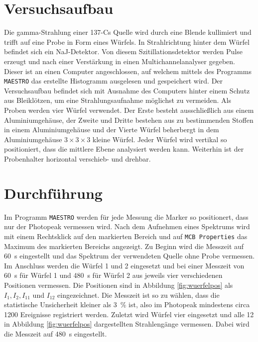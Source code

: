 \newpage
\section{Versuchsaufbau}
\label{sec:Aufbau}

Die gamma-Strahlung einer 137-Cs %
Quelle wird durch eine Blende kullimiert und trifft auf eine Probe in Form
eines Würfels.
In Strahlrichtung hinter dem Würfel befindet sich ein NaJ-Detektor.
Von diesem Szitillationsdetektor werden Pulse erzeugt
und nach einer Verstärkung in einen Multichannelanalyser gegeben.
Dieser ist an einen Computer angeschlossen,
auf welchem mittels des Programms \texttt{MAESTRO}
das erstellte Histogramm ausgelesen und gespeichert wird.
Der Versuchsaufbau befindet sich mit Ausnahme des Computers hinter einem
Schutz aus Bleiklötzen, um eine Strahlungsaufnahme möglichst zu vermeiden.
Als Proben werden vier Würfel verwendet.
Der Erste besteht ausschließlich aus einem Aluminiumgehäuse, der Zweite und Dritte
bestehen aus zu bestimmenden Stoffen in einem Aluminiumgehäuse
und der Vierte Würfel beherbergt in dem Aluminiumgehäuse $3 \times 3 \times 3$
kleine Würfel.
Jeder Würfel wird vertikal so positioniert, dass die mittlere Ebene analysiert
werden kann. Weiterhin ist der Probenhalter horizontal verschieb- und drehbar.

\section{Durchführung}
\label{sec:Durchführung}

Im Programm \texttt{MAESTRO} werden für jede Messung die Marker so positionert,
dass nur der Photopeak vermessen wird. Nach dem Aufnehmen eines Spektrums
wird mit einem Rechtsklick auf den markierten Bereich und auf
\texttt{MCB Properties} das Maximum des markierten Bereichs angezeigt.
Zu Beginn wird die Messzeit auf \SI{60}{\second} eingestellt und das Spektrum
der verwendeten Quelle ohne Probe vermessen. Im Anschluss werden die
Würfel \num{1} und \num{2} eingesetzt und bei einer Messzeit von
\SI{60}{\second} für Würfel \num{1} und \SI{480}{\second} für Würfel \num{2}
aus jeweils vier verschiedenen Positionen vermessen. Die Positionen sind
in Abbildung \ref{fig:wuerfelpos} als $I_1, I_2, I_{11}$ und $I_{12}$ eingezeichnet.
Die Messzeit ist so zu wählen, dass die statistische Unsicherheit kleiner
als \SI{3}{\percent} ist, also im Photopeak mindestens circa \num{1200}
Ereignisse registriert werden.
Zuletzt wird Würfel vier eingesetzt und alle \num{12} in Abbildung
\ref{fig:wuerfelpos} dargestellten Strahlengänge vermessen. Dabei wird die
Messzeit auf \SI{480}{\second} eingestellt.

